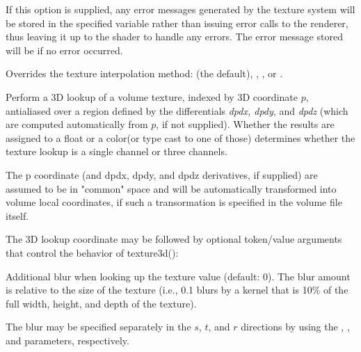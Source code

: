 \documentclass[11pt,letterpaper]{book}
\def\color{{\cf color}\xspace}
\def\float{{\cf float}\xspace}
\def\commonspace{{\cf "common"} space\xspace}
\begin{document}
\vspace{12pt}
If this option is supplied, any error messages generated by the texture
system will be stored in the specified variable rather than issuing error
calls to the renderer, thus leaving it up to the shader to handle any
errors. The error message stored will be \qkw{} if no error occurred.
\apiend
\vspace{-16pt}

\vspace{12pt}
Overrides the texture interpolation method:  (the 
default), , , or .
\apiend
\vspace{-16pt}

\apiend


Perform a 3D lookup of a volume texture, indexed by 3D coordinate
$p$, antialiased over a region defined by the differentials
\emph{dpdx, dpdy}, and \emph{dpdz} (which are computed
automatically from $p$, if not supplied).  Whether the results
are assigned to a \float or a \color (or type cast to one of those)
determines whether the texture lookup is a single channel or three
channels.

The {\cf p} coordinate (and {\cf dpdx}, {\cf dpdy}, and {\cf dpdz}
derivatives, if supplied) are assumed to be in \commonspace and will be
automatically transformed into volume local coordinates, if such a
transormation is specified in the volume file itself.

The 3D lookup coordinate may be followed by optional token/value
arguments that control the behavior of {\cf texture3d()}:

\vspace{12pt}
Additional blur when looking up the texture value (default: 0).  The
blur amount is relative to the size of the texture (i.e., 0.1 blurs by a
kernel that is 10\% of the full width, height, and depth of the texture).

The blur may be specified separately in the $s$, $t$, and $r$ directions by
using the , , and  parameters, respectively.
\apiend
\vspace{-16pt}
\end{document}
